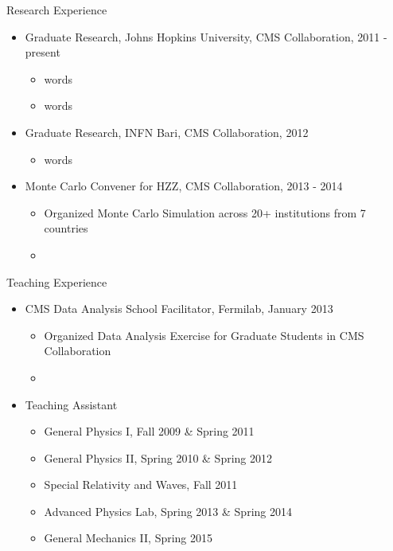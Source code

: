 \begin{small}

\begin{cvlist}{Research Experience}
\item
\begin{itemize}\itemsep=0.25em
	\item Graduate Research, Johns Hopkins University, CMS Collaboration, 2011 - present
         \begin{itemize}
		\item words
		\item words
	\end{itemize}
	\item Graduate Research, INFN Bari, CMS Collaboration, 2012
	\begin{itemize}
		\item words
	\end{itemize}
	\item Monte Carlo Convener for HZZ, CMS Collaboration, 2013 - 2014
	\begin{itemize}
		\item Organized Monte Carlo Simulation across 20+ institutions from 7 countries
		\item 
	\end{itemize}
\end{itemize}
\end{cvlist}

\begin{cvlist}{Teaching Experience}
\item
\begin{itemize}\itemsep=0.25em
	\item CMS Data Analysis School Facilitator, Fermilab, January 2013
	\begin{itemize}
		\item Organized Data Analysis Exercise for Graduate Students in CMS Collaboration
		\item 
	\end{itemize}
	\item Teaching Assistant
	\begin{itemize}
		\item General Physics I, Fall 2009 \& Spring 2011
		\item General Physics II, Spring 2010 \& Spring 2012
		\item Special Relativity and Waves, Fall 2011
		\item Advanced Physics Lab, Spring 2013 \& Spring 2014
		\item General Mechanics II, Spring 2015
	\end{itemize}
\end{itemize}
\end{cvlist}


\end{small}

